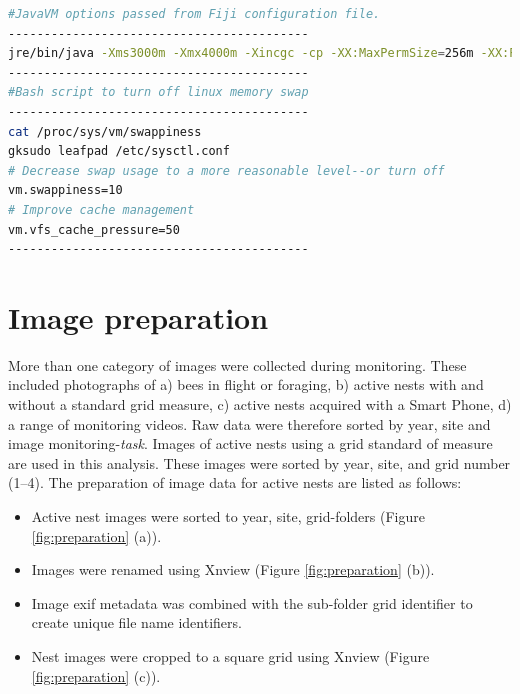 \begin{lstlisting}[language=bash, caption={[Operating system configuration.]JavaVM memory options passed from Fiji's configuration files; and Ubuntu swap memory and cache adjustments. These were made to improve the stability of the operating system for image processing tasks.}, label=cd:java]
#JavaVM options passed from Fiji configuration file.
------------------------------------------
jre/bin/java -Xms3000m -Xmx4000m -Xincgc -cp -XX:MaxPermSize=256m -XX:PermSize=256m -XX:NewRatio=5 -XX:CMSTriggerRatio=20 -XX:+UseCompressedOops -XX:+UseParNewGC -XX:MinHeapFreeRatio=5 -XX:MaxHeapFreeRatio=10 -- ij.jar ij.ImageJ
------------------------------------------
#Bash script to turn off linux memory swap
------------------------------------------
cat /proc/sys/vm/swappiness
gksudo leafpad /etc/sysctl.conf
# Decrease swap usage to a more reasonable level--or turn off
vm.swappiness=10
# Improve cache management
vm.vfs_cache_pressure=50
------------------------------------------
\end{lstlisting}

\section{Image preparation}\label{sec:image-preparation}

More than one category of images were collected during monitoring. These included photographs of a) bees in flight or foraging, b) active nests with and without a standard grid measure, c) active nests acquired with a Smart Phone, d) a range of monitoring videos. Raw data were therefore sorted by year, site and image monitoring-\emph{task}. Images of active nests using a grid standard of measure are used in this analysis. These images were sorted by year, site, and grid number (1--4). The preparation of image data for active nests are listed as follows:

\begin{itemize}
\item Active nest images were sorted to year, site, grid-folders (Figure \ref{fig:preparation} (a)). 
\item Images were renamed using Xnview (Figure \ref{fig:preparation} (b)).
\item Image exif metadata was combined with the sub-folder grid identifier to create unique file name identifiers.
\item Nest images were cropped to a square grid using Xnview (Figure \ref{fig:preparation} (c)).
\end{itemize}

